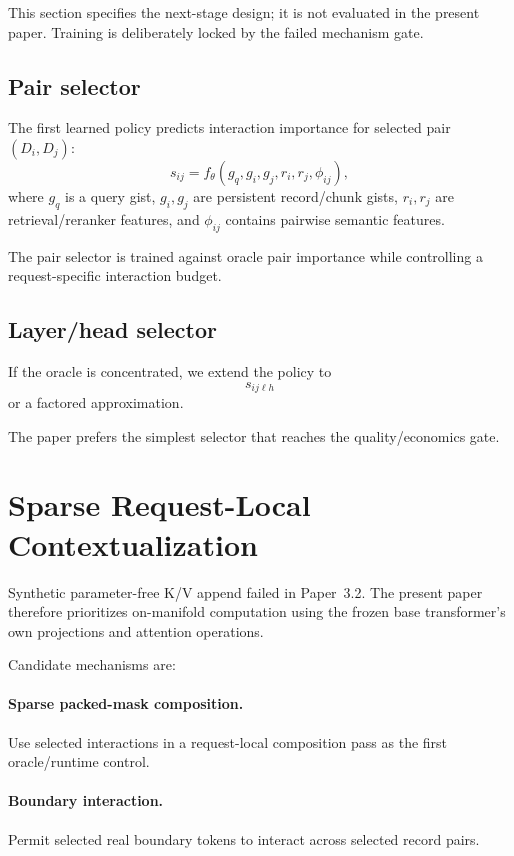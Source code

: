 \documentclass[11pt]{article}
\begin{document}
This section specifies the next-stage design; it is not evaluated in the
present paper. Training is deliberately locked by the failed mechanism gate.

\subsection{Pair selector}

The first learned policy predicts interaction importance for selected pair
$(D_i,D_j)$:
\[
s_{ij}=
f_\theta(g_q,g_i,g_j,r_i,r_j,\phi_{ij}),
\]
where $g_q$ is a query gist, $g_i,g_j$ are persistent record/chunk gists,
$r_i,r_j$ are retrieval/reranker features, and $\phi_{ij}$ contains pairwise
semantic features.

The pair selector is trained against oracle pair importance while controlling a
request-specific interaction budget.

\subsection{Layer/head selector}

If the oracle is concentrated, we extend the policy to
\[
s_{ij\ell h}
\]
or a factored approximation.

The paper prefers the simplest selector that reaches the quality/economics gate.

\section{Sparse Request-Local Contextualization}

Synthetic parameter-free K/V append failed in Paper~3.2. The present paper
therefore prioritizes on-manifold computation using the frozen base
transformer's own projections and attention operations.

Candidate mechanisms are:

\paragraph{Sparse packed-mask composition.}
Use selected interactions in a request-local composition pass as the first
oracle/runtime control.

\paragraph{Boundary interaction.}
Permit selected real boundary tokens to interact across selected record pairs.
\end{document}
